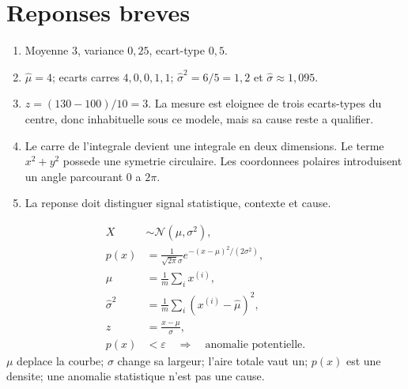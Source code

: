 \section{Reponses breves}

\begin{enumerate}
  \item Moyenne $3$, variance $0{,}25$, ecart-type $0{,}5$.
  \item $\widehat\mu=4$; ecarts carres $4,0,0,1,1$;
  $\widehat\sigma^2=6/5=1{,}2$ et $\widehat\sigma\approx1{,}095$.
  \item $z=(130-100)/10=3$. La mesure est eloignee de trois ecarts-types du
  centre, donc inhabituelle sous ce modele, mais sa cause reste a qualifier.
  \item Le carre de l'integrale devient une integrale en deux dimensions. Le
  terme $x^2+y^2$ possede une symetrie circulaire. Les coordonnees polaires
  introduisent un angle parcourant $0$ a $2\pi$.
  \item La reponse doit distinguer signal statistique, contexte et cause.
\end{enumerate}

\begin{revisionbox}
\begin{align*}
X&\sim\mathcal N(\mu,\sigma^2),\\
p(x)&=\frac{1}{\sqrt{2\pi}\sigma}
e^{-(x-\mu)^2/(2\sigma^2)},\\
\widehat\mu&=\frac1m\sum_i x^{(i)},\\
\widehat\sigma^2&=\frac1m\sum_i(x^{(i)}-\widehat\mu)^2,\\
z&=\frac{x-\mu}{\sigma},\\
p(x)&<\varepsilon\quad\Rightarrow\quad\text{anomalie potentielle}.
\end{align*}
$\mu$ deplace la courbe; $\sigma$ change sa largeur; l'aire totale vaut un;
$p(x)$ est une densite; une anomalie statistique n'est pas une cause.
\end{revisionbox}
